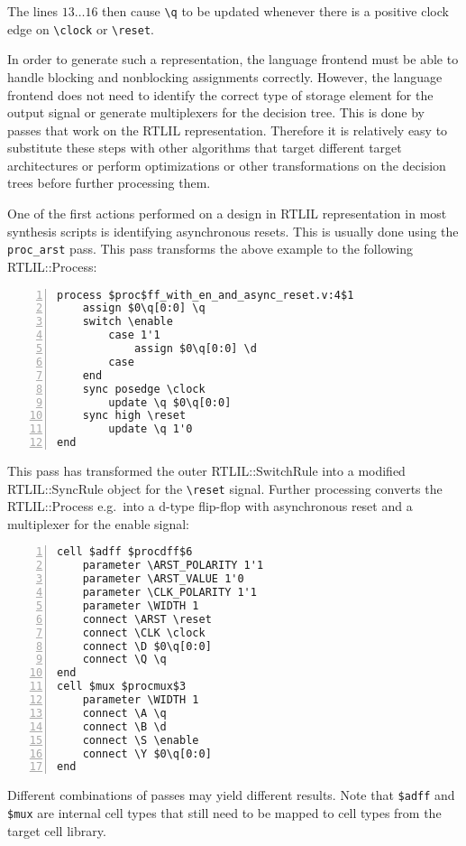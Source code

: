 The lines $13 \dots 16$  then cause {\tt \textbackslash{}q} to be updated whenever there is
a positive clock edge on {\tt \textbackslash{}clock} or {\tt \textbackslash{}reset}.

In order to generate such a representation, the language frontend must be able to handle blocking
and nonblocking assignments correctly. However, the language frontend does not need to identify
the correct type of storage element for the output signal or generate multiplexers for the
decision tree. This is done by passes that work on the RTLIL representation. Therefore it is
relatively easy to substitute these steps with other algorithms that target different target
architectures or perform optimizations or other transformations on the decision trees before
further processing them.

One of the first actions performed on a design in RTLIL representation in most
synthesis scripts is identifying asynchronous resets. This is usually done using the {\tt proc\_arst}
pass. This pass transforms the above example to the following RTLIL::Process:

\begin{lstlisting}[numbers=left,frame=single]
process $proc$ff_with_en_and_async_reset.v:4$1
	assign $0\q[0:0] \q
	switch \enable
		case 1'1
			assign $0\q[0:0] \d
		case 
	end
	sync posedge \clock
		update \q $0\q[0:0]
	sync high \reset
		update \q 1'0
end
\end{lstlisting}

This pass has transformed the outer RTLIL::SwitchRule into a modified RTLIL::SyncRule object
for the {\tt \textbackslash{}reset} signal. Further processing converts the RTLIL::Process
e.g.~into a d-type flip-flop with asynchronous reset and a multiplexer for the enable signal:

\begin{lstlisting}[numbers=left,frame=single]
cell $adff $procdff$6
	parameter \ARST_POLARITY 1'1
	parameter \ARST_VALUE 1'0
	parameter \CLK_POLARITY 1'1
	parameter \WIDTH 1
	connect \ARST \reset
	connect \CLK \clock
	connect \D $0\q[0:0]
	connect \Q \q
end
cell $mux $procmux$3
	parameter \WIDTH 1
	connect \A \q
	connect \B \d
	connect \S \enable
	connect \Y $0\q[0:0]
end
\end{lstlisting}

Different combinations of passes may yield different results. Note that {\tt \$adff} and {\tt
\$mux} are internal cell types that still need to be mapped to cell types from the
target cell library.

